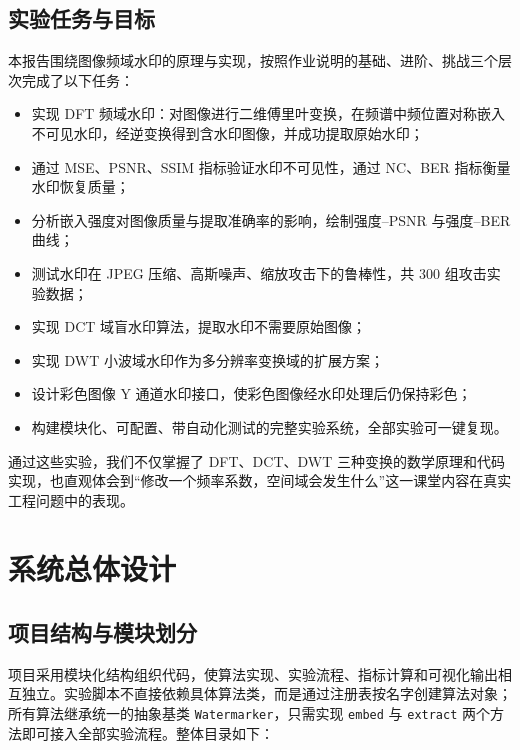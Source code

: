 \documentclass[11pt]{ctexart}
\begin{document}
\subsection{实验任务与目标}

本报告围绕图像频域水印的原理与实现，按照作业说明的基础、进阶、挑战三个层次完成了以下任务：

\begin{itemize}
  \item 实现 DFT 频域水印：对图像进行二维傅里叶变换，在频谱中频位置对称嵌入不可见水印，经逆变换得到含水印图像，并成功提取原始水印；
  \item 通过 MSE、PSNR、SSIM 指标验证水印不可见性，通过 NC、BER 指标衡量水印恢复质量；
  \item 分析嵌入强度对图像质量与提取准确率的影响，绘制强度--PSNR 与强度--BER 曲线；
  \item 测试水印在 JPEG 压缩、高斯噪声、缩放攻击下的鲁棒性，共 300 组攻击实验数据；
  \item 实现 DCT 域盲水印算法，提取水印不需要原始图像；
  \item 实现 DWT 小波域水印作为多分辨率变换域的扩展方案；
  \item 设计彩色图像 Y 通道水印接口，使彩色图像经水印处理后仍保持彩色；
  \item 构建模块化、可配置、带自动化测试的完整实验系统，全部实验可一键复现。
\end{itemize}

通过这些实验，我们不仅掌握了 DFT、DCT、DWT 三种变换的数学原理和代码实现，也直观体会到“修改一个频率系数，空间域会发生什么”这一课堂内容在真实工程问题中的表现。

\section{系统总体设计}

\subsection{项目结构与模块划分}

项目采用模块化结构组织代码，使算法实现、实验流程、指标计算和可视化输出相互独立。实验脚本不直接依赖具体算法类，而是通过注册表按名字创建算法对象；所有算法继承统一的抽象基类 \texttt{Watermarker}，只需实现 \texttt{embed} 与 \texttt{extract} 两个方法即可接入全部实验流程。整体目录如下：
\end{document}
